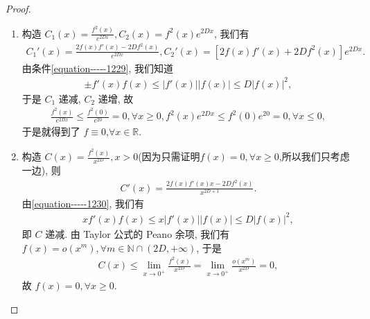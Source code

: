\documentclass[../../main.tex]{subfiles}%
\begin{document}
\begin{proof}
\begin{enumerate}
\item 构造 $C_1(x)=\frac{f^2(x)}{e^{2Dx}},C_2(x)=f^2(x)e^{2Dx}$, 我们有
\begin{align*}
C_1'(x)=\frac{2f(x)f'(x)-2Df^2(x)}{e^{2Dx}},C_2'(x)=[2f(x)f'(x)+2Df^2(x)]e^{2Dx}.
\end{align*}
由条件\eqref{equation-----1229}, 我们知道
\begin{align*}
\pm f'(x)f(x)\leqslant|f'(x)||f(x)|\leqslant D|f(x)|^2,
\end{align*}
于是 $C_1$ 递减, $C_2$ 递增, 故
\begin{align*}
\frac{f^2(x)}{e^{2Dx}}\leqslant\frac{f^2(0)}{e^{20}}=0,\forall x\geqslant0,f^2(x)e^{2Dx}\leqslant f^2(0)e^{20}=0,\forall x\leqslant0,
\end{align*}
于是就得到了 $f\equiv0$,$\forall x\in \mathbb{R}$.

\item 构造 $C(x)=\frac{f^2(x)}{x^{2D}},x>0$(因为只需证明$f(x)=0,\forall x\geqslant0$,所以我们只考虑一边), 则
\begin{align*}
C'(x)=\frac{2f(x)f'(x)x - 2Df^2(x)}{x^{2D + 1}}.
\end{align*}
由\eqref{equation-----1230}, 我们有
\begin{align*}
xf'(x)f(x)\leqslant x|f'(x)||f(x)|\leqslant D|f(x)|^2,
\end{align*}
即 $C$ 递减. 由 Taylor 公式的 Peano 余项, 我们有 $f(x)=o(x^m),\forall m\in\mathbb{N}\cap (2D,+\infty)$, 于是 
\begin{align*}
C(x)\leqslant \lim_{x\rightarrow 0^+} \frac{f^2(x)}{x^{2D}}=\lim_{x\rightarrow 0^+} \frac{o\left( x^m \right)}{x^{2D}}=0,
\end{align*}
故 $f(x)=0,\forall x\geqslant0$. 
\end{enumerate}
\end{proof}
\end{document}
